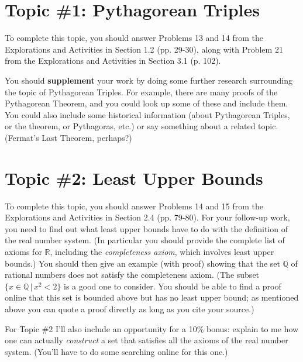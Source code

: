 \documentclass[letterpaper,12pt]{article}
\theoremstyle{definition}
\begin{document}
\section*{Topic \#1: Pythagorean Triples}
To complete this topic, you should answer Problems 13 and 14 from the Explorations and Activities in Section 1.2 (pp. 29-30), along with Problem 21 from the Explorations and Activities in Section 3.1 (p. 102).

You should {\bf supplement} your work by doing some further research surrounding the topic of Pythagorean Triples. For example, there are many proofs of the Pythagorean Theorem, and you could look up some of these and include them. You could also include some historical information (about Pythagorean Triples, or the theorem, or Pythagoras, etc.) or say something about a related topic. (Fermat's Last Theorem, perhaps?)

\section*{Topic \#2: Least Upper Bounds}
To complete this topic, you should answer Problems 14 and 15 from the Explorations and Activities in Section 2.4 (pp. 79-80). For your follow-up work, you need to find out what least upper bounds have to do with the definition of the real number system. (In particular you should provide the complete list of axioms for $\mathbb{R}$, including the {\em completeness axiom}, which involves least upper bounds.) You should then give an example (with proof) showing that the set $\mathbb{Q}$ of rational numbers does not satisfy the completeness axiom. (The subset $\{x\in \mathbb{Q} \, |\, x^2<2\}$ is a good one to consider. You should be able to find a proof online that this set is bounded above but has no least upper bound; as mentioned above you can quote a proof directly as long as you cite your source.)

For Topic \#2 I'll also include an opportunity for a 10\% bonus: explain to me how one can actually {\em construct} a set that satisfies all the axioms of the real number system. (You'll have to do some searching online for this one.)
\end{document}
